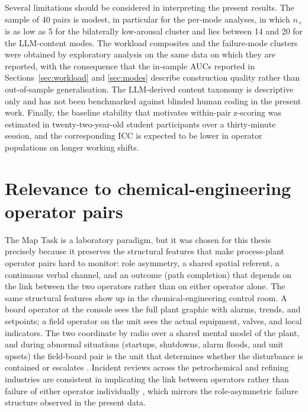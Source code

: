 Several limitations should be considered in interpreting the present results. The sample of 40 pairs is modest, in particular for the per-mode analyses, in which $n_+$ is as low as 5 for the bilaterally low-arousal cluster and lies between 14 and 20 for the LLM-content modes. The workload composites and the failure-mode clusters were obtained by exploratory analysis on the same data on which they are reported, with the consequence that the in-sample AUCs reported in Sections~\ref{sec:workload} and \ref{sec:modes} describe construction quality rather than out-of-sample generalisation. The LLM-derived content taxonomy is descriptive only and has not been benchmarked against blinded human coding in the present work. Finally, the baseline stability that motivates within-pair z-scoring was estimated in twenty-two-year-old student participants over a thirty-minute session, and the corresponding ICC is expected to be lower in operator populations on longer working shifts.

\section{Relevance to chemical-engineering operator pairs}\label{sec:cheme}

The Map Task is a laboratory paradigm, but it was chosen for this thesis precisely because it preserves the structural features that make process-plant operator pairs hard to monitor: role asymmetry, a shared spatial referent, a continuous verbal channel, and an outcome (path completion) that depends on the link between the two operators rather than on either operator alone. The same structural features show up in the chemical-engineering control room. A board operator at the console sees the full plant graphic with alarms, trends, and setpoints; a field operator on the unit sees the actual equipment, valves, and local indicators. The two coordinate by radio over a shared mental model of the plant, and during abnormal situations (startups, shutdowns, alarm floods, and unit upsets) the field-board pair is the unit that determines whether the disturbance is contained or escalates \cite{bullemer1996abnormal,nimmo1998abnormal,nazir2012role}. Incident reviews across the petrochemical and refining industries are consistent in implicating the link between operators rather than failure of either operator individually \cite{reason1990human,kletz2001learned}, which mirrors the role-asymmetric failure structure observed in the present data.

